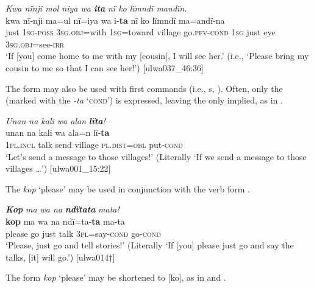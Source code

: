 \ea%
    \label{ex:syntax:97}
          \textit{Kwa nïnji mol niya wa} \textbf{\textit{ita}} \textit{nï ko lïmndï mandïn.}\\
\gll    kwa  nï-nji    ma=ul      nï=iya      wa    i-\textbf{ta} nï    ko  lïmndï  ma=andï-na\\
    just    1\textsc{sg-poss}  \textsc{3sg.obj=}with  1\textsc{sg}=toward  village  go.\textsc{pfv-cond}    1\textsc{sg}  just  eye    3\textsc{sg.obj}=see-\textsc{irr}\\
\glt `If [you] come home to me with my [cousin], I will see her.’ (i.e., ‘Please bring my cousin to me so that I can see her!’) [ulwa037\_46:36]
\z

The  form may also be used with first  commands (i.e., s, ). Often, only the  (marked with the   \textit{-ta} ‘\textsc{cond}’) is expressed, leaving the  only implied, as in .

\ea%
    \label{ex:syntax:98}
          \textit{Unan na kali wa alan} \textbf{\textit{lïta}}\textit{!}\\
\gll    unan    na    kali  wa    ala=n      lï-\textbf{ta}\\
    1\textsc{pl.incl}  talk  send  village  \textsc{pl.dist=obl}  put\textsc{{}-cond}\\
\glt `Let’s send a message to those villages!’ (Literally ‘If we send a message to those villages …’) [ulwa001\_15:22]
\z

The  \textit{kop} ‘please’ may be used in conjunction with the  verb form .

\ea%
    \label{ex:syntax:99}
          \textbf{\textit{Kop}} \textit{ma wa na} \textbf{\textit{ndïtata}} \textit{mata!}\\
\gll    \textbf{kop}  ma  wa  na    ndï=ta-\textbf{ta}      ma-ta\\
    please  go  just  talk  3\textsc{pl}=say-\textsc{cond}  go-\textsc{cond}\\
\glt `Please, just go and tell stories!’ (Literally ‘If [you] please just go and say the talks, [it] will go.’) [ulwa014†]
\z

\newpage

The form \textit{kop} ‘please’ may be shortened to [ko], as in  and .


